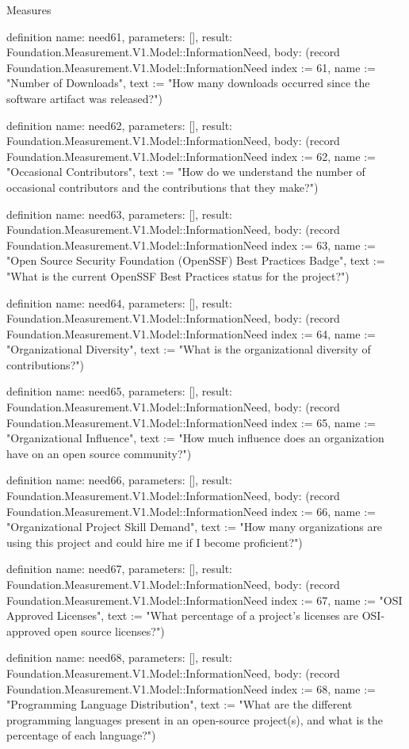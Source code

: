 \begin{lexlean}{Measures}
\begin{semanticmodule}
definition{
  name: need61,
  parameters: [],
  result: Foundation.Measurement.V1.Model::InformationNeed,
  body: (record Foundation.Measurement.V1.Model::InformationNeed {index := 61, name := "Number of Downloads", text := "How many downloads occurred since the software artifact was released?"})
}

definition{
  name: need62,
  parameters: [],
  result: Foundation.Measurement.V1.Model::InformationNeed,
  body: (record Foundation.Measurement.V1.Model::InformationNeed {index := 62, name := "Occasional Contributors", text := "How do we understand the number of occasional contributors and the contributions that they make?"})
}

definition{
  name: need63,
  parameters: [],
  result: Foundation.Measurement.V1.Model::InformationNeed,
  body: (record Foundation.Measurement.V1.Model::InformationNeed {index := 63, name := "Open Source Security Foundation (OpenSSF) Best Practices Badge", text := "What is the current OpenSSF Best Practices status for the project?"})
}

definition{
  name: need64,
  parameters: [],
  result: Foundation.Measurement.V1.Model::InformationNeed,
  body: (record Foundation.Measurement.V1.Model::InformationNeed {index := 64, name := "Organizational Diversity", text := "What is the organizational diversity of contributions?"})
}

definition{
  name: need65,
  parameters: [],
  result: Foundation.Measurement.V1.Model::InformationNeed,
  body: (record Foundation.Measurement.V1.Model::InformationNeed {index := 65, name := "Organizational Influence", text := "How much influence does an organization have on an open source community?"})
}

definition{
  name: need66,
  parameters: [],
  result: Foundation.Measurement.V1.Model::InformationNeed,
  body: (record Foundation.Measurement.V1.Model::InformationNeed {index := 66, name := "Organizational Project Skill Demand", text := "How many organizations are using this project and could hire me if I become proficient?"})
}

definition{
  name: need67,
  parameters: [],
  result: Foundation.Measurement.V1.Model::InformationNeed,
  body: (record Foundation.Measurement.V1.Model::InformationNeed {index := 67, name := "OSI Approved Licenses", text := "What percentage of a project’s licenses are OSI-approved open source licenses?"})
}

definition{
  name: need68,
  parameters: [],
  result: Foundation.Measurement.V1.Model::InformationNeed,
  body: (record Foundation.Measurement.V1.Model::InformationNeed {index := 68, name := "Programming Language Distribution", text := "What are the different programming languages present in an open-source project(s), and what is the percentage of each language?"})
}


\end{semanticmodule}
\end{lexlean}
